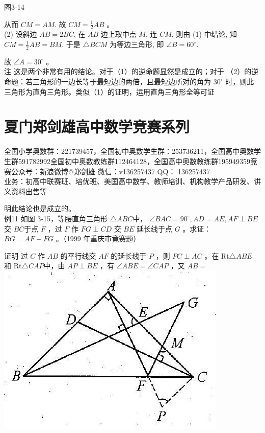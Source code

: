 \documentclass[10pt]{article}
\begin{document}
图3-14

从而 $C M=A M$. 故 $C M=\frac{1}{2} A B$ 。\\
(2) 设斜边 $A B=2 B C$, 在 $A B$ 边上取中点 $M$, 连 $C M$, 则由 (1) 中结论, 知 $C M=\frac{1}{2} A B=B M$. 于是 $\triangle B C M$ 为等边三角形, 即 $\angle B=60^{\circ}$.

故 $\angle A=30^{\circ}$ 。\\
注 这是两个非常有用的结论。对于（1）的逆命题显然是成立的；对于 （2）的逆命题：若三角形的一边长等于最短边的两倍，且最短边所对的角为 $30^{\circ}$ 时，则此三角形为直角三角形。类似（1）的证明，运用直角三角形全等可证

\section*{夏门郑剑雄高中数学竞赛系列}
全国小学奥数群：221739457，全国初中奥数学生群：253736211，全国高中奥数学生群591782992全国初中奥数教练群112464128，全国高中奥数教练群195949359竞赛公众号：新浪微博@郑剑雄 微信：v136257437 QQ： 136257437\\
业务：初高中联赛班、培优班、美国高中数学、教师培训、机构教学产品研发、讲义资料出售等

明此结论也是成立的。\\
例11 如图 3-15，等腰直角三角形 $\triangle A B C$中， $\angle B A C=90^{\circ}, A D=A E, A F \perp B E$ 交 $B C$于点 $F$ ，过 $F$ 作 $F G \perp C D$ 交 $B E$ 延长线于点 $G$ 。求证： $B G=A F+F G$ 。（1999 年重庆市竟赛题）

证明 过 $C$ 作 $A B$ 的平行线交 $A F$ 的延长线于 $P$ ，则 $P C \perp A C$ 。在 $\mathrm{Rt} \triangle A B E$ 和 $\mathrm{Rt} \triangle C A P$中，由 $A P \perp B E$ ，有 $\angle A B E=\angle C A P$ ，又 $A B=$\\
\includegraphics[max width=\textwidth, center]{2024_10_30_2c8f45efd4a519b08e1ag-033}
\end{document}
